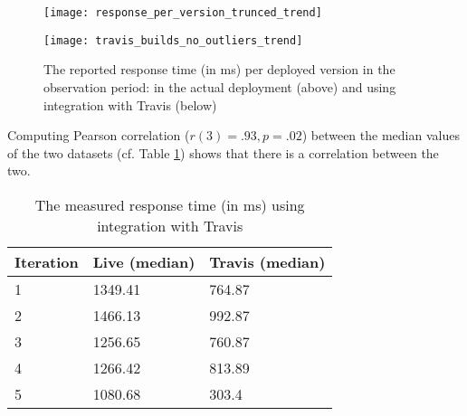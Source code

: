       \begin{figure}[h!]
        \centering
        \texttt{[image: response\_per\_version\_trunced\_trend]}


        \advance\leftskip-0.2cm
        \texttt{[image: travis\_builds\_no\_outliers\_trend]}
        \caption{The reported response time (in ms) per deployed version in the observation period: 
        in the actual deployment (above) and using integration with Travis (below)}        
        
        \label{fig:response_times_preemptive}
      \end{figure}

  Computing Pearson correlation ($r(3)=.93, p=.02$) between the median values of the two datasets (cf. Table \ref{tab:correlations}) shows that there is a correlation between the two.


    \begin{table}[h]
      
      \centering
      \begin{tabular}{lll}
        \toprule
        Iteration & \bfseries Live (median) & \bfseries Travis (median)\\
        \midrule
        1 & 1349.41 & 764.87\\ 
        2 & 1466.13 & 992.87\\
        3 & 1256.65 & 760.87\\
        4 & 1266.42 & 813.89\\
        5 & 1080.68 & 303.4\\
        \bottomrule
      
      \end{tabular}
      \caption{The measured response time (in ms) using integration with Travis}
      \label{tab:correlations}
    \end{table}





